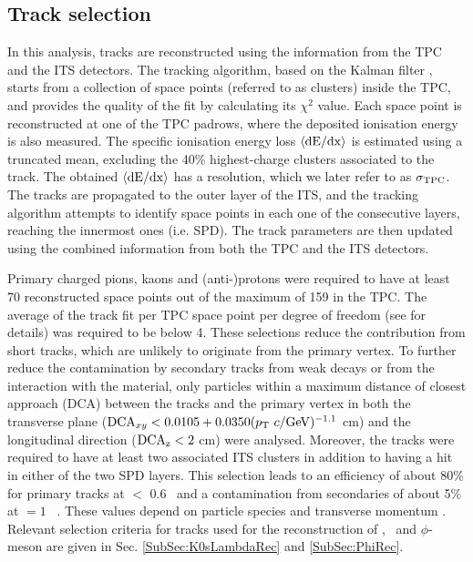 \subsection{Track selection}
\label{SubSec:Track}
In this analysis, tracks are reconstructed using the information from the TPC and the ITS detectors. The tracking algorithm, based on the Kalman filter \cite{Billoir:1983mz,Billoir:1985nq}, starts from a collection of space points (referred to as clusters) inside the TPC, and provides the quality of the fit by calculating its $\chi^{2}$ value. Each space point is reconstructed at one of the TPC padrows, where the deposited ionisation energy is also measured. The specific ionisation energy loss $\langle{\rm{dE}/dx}\rangle$ is estimated using a truncated mean, excluding the 40\% highest-charge clusters associated to the track. The obtained $\langle{\rm{dE}/dx}\rangle$ has a resolution, which we later refer to as $\sigma_{\rm{TPC}}$. The tracks are propagated to the outer layer of the ITS, and the tracking algorithm attempts to identify space points in each one of the consecutive layers, reaching the innermost ones (i.e. SPD). The track parameters are then updated using the combined information from both the TPC and the ITS detectors. 

Primary charged pions, kaons and (anti-)protons were required to have at least 70 reconstructed space points out of the maximum of 159 in the TPC. The average of the track fit per TPC space point per degree of freedom (see \cite{Abelev:2014ffa} for details) was required to be below 4. These selections reduce the contribution from short tracks, which are unlikely to originate from the primary vertex. To further reduce the contamination by secondary tracks from weak decays or from the interaction with the material, only particles within a maximum distance of closest approach (DCA) between the tracks and the primary vertex in both the transverse plane (${\rm{DCA}}_{xy} < 0.0105 + 0.0350(p_{\rm{T}}~c/{\rm{GeV}})^{-1.1}$ cm) and the longitudinal direction ($\rm{DCA}_{z} < 2$ cm) were analysed. Moreover, the tracks were required to have at least two associated ITS clusters in addition to having a hit in either of the two SPD layers. This selection leads to an efficiency of about 80\% for primary tracks at \pT$ < $ 0.6 \GeV~and a contamination from secondaries of about 5\% at \pT $= 1$ \GeV~\cite{Abelev:2013vea}. These values depend on particle species and transverse momentum \cite{Abelev:2013vea}. Relevant selection criteria for tracks used for the reconstruction of \Ks, \lambdas~and $\phi$-meson are given in Sec. \ref{SubSec:K0sLambdaRec} and \ref{SubSec:PhiRec}.

